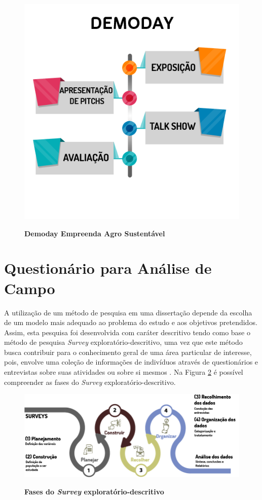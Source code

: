 \begin{figure}[H]
\centering
\caption{\textbf{Demoday Empreenda Agro Sustentável}}
\includegraphics[scale=0.5]{Imagens/workshop-04.png}
\label{figura_33}
\end{figure}

\section{Questionário para Análise de Campo}

A utilização de um método de pesquisa em uma dissertação depende da escolha de um modelo mais adequado ao problema do estudo e aos objetivos pretendidos. Assim, esta pesquisa foi desenvolvida com caráter descritivo tendo como base o método de pesquisa \textit{Survey} exploratório-descritivo, uma vez que este método busca contribuir para o conhecimento geral de uma área particular de interesse, pois, envolve uma coleção de informações de indivíduos através de questionários e entrevistas sobre suas atividades ou sobre si mesmos  \cite{forza_survey_2002}. Na Figura \ref{figura_8} é possível compreender as fases do \textit{Survey} exploratório-descritivo.


\begin{figure}[H]
\centering
\caption{\textbf{Fases do \textit{Survey} exploratório-descritivo}}
\includegraphics[scale=0.5]{Imagens/survey.png}
\label{figura_8}
\end{figure}


